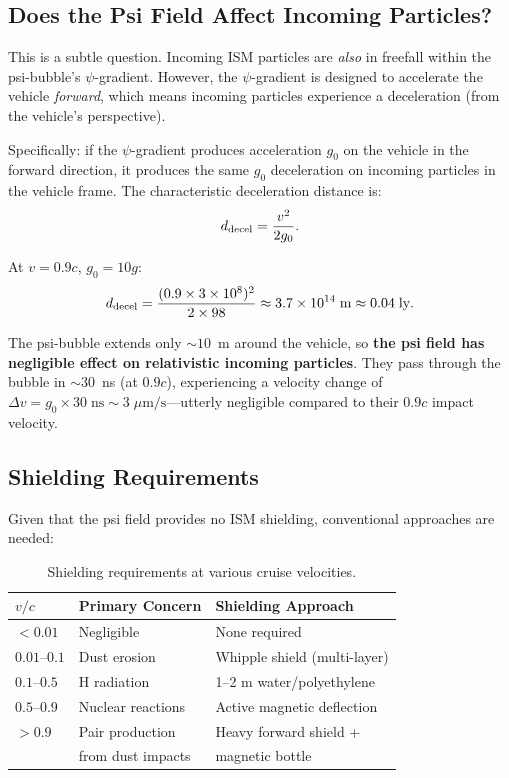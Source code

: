 \documentclass[aps,prd,twocolumn,superscriptaddress,nofootinbib]{revtex4-2}
\newcommand{\ee}[1]{\times 10^{#1}}
\begin{document}
\subsection{Does the Psi Field Affect Incoming Particles?}

This is a subtle question.  Incoming ISM particles are \textit{also}
in freefall within the psi-bubble's $\psi$-gradient.  However, the
$\psi$-gradient is designed to accelerate the vehicle \textit{forward},
which means incoming particles experience a deceleration (from the
vehicle's perspective).

Specifically: if the $\psi$-gradient produces acceleration $g_0$ on
the vehicle in the forward direction, it produces the same $g_0$
deceleration on incoming particles in the vehicle frame.  The
characteristic deceleration distance is:
\begin{equation}
d_{\rm decel} = \frac{v^2}{2g_0}.
\end{equation}

At $v = 0.9c$, $g_0 = 10g$:
\begin{equation}
d_{\rm decel} = \frac{(0.9\times 3\ee{8})^2}{2\times 98}
\approx 3.7\ee{14}\;\text{m} \approx 0.04\;\text{ly}.
\end{equation}

The psi-bubble extends only $\sim 10$~m around the vehicle, so
\textbf{the psi field has negligible effect on relativistic incoming
particles}.  They pass through the bubble in $\sim 30$~ns (at $0.9c$),
experiencing a velocity change of $\Delta v = g_0 \times 30\;\text{ns}
\sim 3\;\mu\text{m/s}$---utterly negligible compared to their
$0.9c$ impact velocity.

\subsection{Shielding Requirements}

Given that the psi field provides no ISM shielding, conventional
approaches are needed:

\begin{table}[H]
\centering
\caption{Shielding requirements at various cruise velocities.}
\label{tab:shielding}
\begin{tabular}{lll}
\toprule
$v/c$ & Primary Concern & Shielding Approach \\
\midrule
$< 0.01$ & Negligible & None required \\
$0.01$--$0.1$ & Dust erosion & Whipple shield (multi-layer) \\
$0.1$--$0.5$ & H radiation & 1--2 m water/polyethylene \\
$0.5$--$0.9$ & Nuclear reactions & Active magnetic deflection \\
$> 0.9$ & Pair production & Heavy forward shield + \\
 & from dust impacts & magnetic bottle \\
\bottomrule
\end{tabular}
\end{table}
\end{document}
